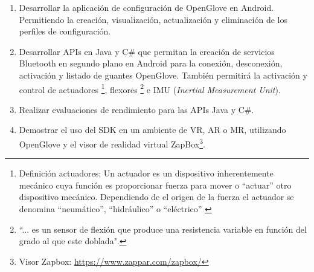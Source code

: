 \begin{enumerate}
\item Desarrollar la aplicación de configuración de OpenGlove en Android. Permitiendo la creación, visualización, actualización y eliminación de los perfiles de configuración.

\item Desarrollar APIs en Java y C\# que permitan la creación de servicios Bluetooth en segundo plano en Android para la conexión, desconexión, activación y listado de guantes OpenGlove.  También permitirá la activación y control de actuadores \footnote{Definición actuadores: Un actuador es un dispositivo inherentemente mecánico cuya función es proporcionar fuerza para mover o “actuar” otro dispositivo mecánico. Dependiendo de el origen de la fuerza el actuador se denomina ``neumático'', ``hidráulico'' o ``eléctrico'' \citep{actuadores}}, flexores \footnote{  ``... es un sensor de flexión que produce una resistencia variable en función del grado al que este doblada".\citep{flexor-sensor-01}} e IMU (\textit{Inertial Measurement Unit}).


\item Realizar evaluaciones de rendimiento para las APIs Java y C\#.

\item Demostrar el uso del SDK en un ambiente de VR, AR o MR, utilizando OpenGlove y el visor de realidad virtual ZapBox\footnote{Visor Zapbox: \url{https://www.zappar.com/zapbox/}}.
\end{enumerate}


